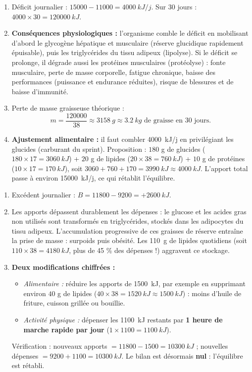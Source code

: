 \documentclass[11pt]{article}
\newcommand{\cle}[1]{{\popxbold\color{popdark}#1}}
\begin{document}
\begin{corrige}
\tcblower
\begin{enumerate}
\item Déficit journalier : $15000 - 11000 = \SI{4000}{kJ/j}$. Sur 30 jours : $4000 \times 30 = \SI{120000}{kJ}$.
\item \textbf{Conséquences physiologiques :} l'organisme comble le déficit en mobilisant d'abord le \cle{glycogène} hépatique et musculaire (réserve glucidique rapidement épuisable), puis les \cle{triglycérides} du tissu adipeux (lipolyse). Si le déficit se prolonge, il dégrade aussi les \cle{protéines musculaires} (protéolyse) : fonte musculaire, perte de masse corporelle, fatigue chronique, baisse des performances (puissance et endurance réduites), risque de blessures et de baisse d'immunité.
\item Perte de masse graisseuse théorique :
\[ m = \dfrac{120000}{38} \approx \SI{3158}{g} \approx \SI{3,2}{kg} \text{ de graisse en 30 jours.} \]
\item \textbf{Ajustement alimentaire :} il faut combler \SI{4000}{kJ/j} en privilégiant les glucides (carburant du sprint). Proposition : $180$ g de glucides ($180 \times 17 = \SI{3060}{kJ}$) + $20$ g de lipides ($20 \times 38 = \SI{760}{kJ}$) + $10$ g de protéines ($10 \times 17 = \SI{170}{kJ}$), soit $3060 + 760 + 170 = \SI{3990}{kJ} \approx \SI{4000}{kJ}$. L'apport total passe à environ \SI{15000}{kJ/j}, ce qui rétablit l'équilibre.
\end{enumerate}
\end{corrige}

\begin{corrige}
\tcblower
\begin{enumerate}
\item Excédent journalier : $B = 11800 - 9200 = +\SI{2600}{kJ}$.
\item Les apports dépassent durablement les dépenses : le glucose et les acides gras non utilisés sont transformés en \cle{triglycérides}, stockés dans les adipocytes du \cle{tissu adipeux}. L'accumulation progressive de ces graisses de réserve entraîne la prise de masse : surpoids puis obésité. Les \SI{110}{g} de lipides quotidiens (soit $110 \times 38 = \SI{4180}{kJ}$, plus de 45 \% des dépenses !) aggravent ce stockage.
\item \textbf{Deux modifications chiffrées :}
\begin{itemize}
\item \emph{Alimentaire :} réduire les apports de \SI{1500}{kJ}, par exemple en supprimant environ $40$ g de lipides ($40 \times 38 = \SI{1520}{kJ} \approx \SI{1500}{kJ}$) : moins d'huile de friture, cuisson grillée ou bouillie.
\item \emph{Activité physique :} dépenser les \SI{1100}{kJ} restants par \textbf{1 heure de marche rapide par jour} ($1 \times 1100 = \SI{1100}{kJ}$).
\end{itemize}
Vérification : nouveaux apports $= 11800 - 1500 = \SI{10300}{kJ}$ ; nouvelles dépenses $= 9200 + 1100 = \SI{10300}{kJ}$. Le bilan est désormais \textbf{nul} : l'équilibre est rétabli.
\end{enumerate}
\end{corrige}
\end{document}
